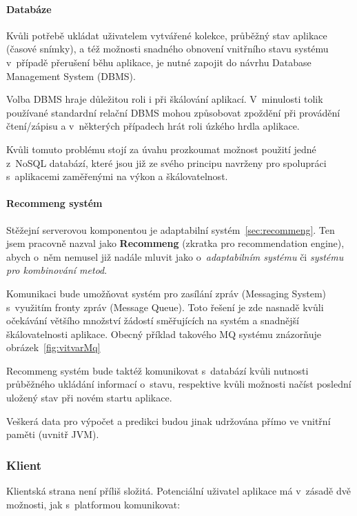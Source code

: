 \documentclass[thesis=M,czech]{FITthesis}[2014/05/07]
\begin{document}
\paragraph{Databáze}

Kvůli potřebě ukládat uživatelem vytvářené kolekce, průběžný stav aplikace (časové snímky), a též možnosti snadného obnovení vnitřního stavu systému v~případě přerušení běhu aplikace, je nutné zapojit do návrhu Database Management System (DBMS).

Volba DBMS hraje důležitou roli i při škálování aplikací. V~minulosti tolik používané standardní relační DBMS mohou způsobovat zpoždění při provádění čtení/zápisu a v~některých případech hrát roli úzkého hrdla aplikace.

Kvůli tomuto problému stojí za úvahu prozkoumat možnost použití jedné z~NoSQL databází, které jsou již ze svého principu navrženy pro spolupráci s~aplikacemi zaměřenými na výkon a škálovatelnost.

\paragraph{Recommeng systém}

Stěžejní serverovou komponentou je adaptabilní systém~\ref{sec:recommeng}. Ten jsem pracovně nazval jako \textbf{Recommeng} (zkratka pro recommendation engine), abych o~něm nemusel již nadále mluvit jako o~\emph{adaptabilním systému} či \emph{systému pro kombinování metod}. 

Komunikaci bude umožňovat systém pro zasílání zpráv (Messaging System) s~využitím fronty zpráv (Message Queue). Toto řešení je zde nasnadě kvůli očekávání většího množství žádostí směřujících na systém a snadnější škálovatelnosti aplikace. Obecný příklad takového MQ systému znázorňuje obrázek~\ref{fig:vitvarMq}

Recommeng systém bude taktéž komunikovat s~databází kvůli nutnosti průběžného ukládání informací o~stavu, respektive kvůli možnosti načíst poslední uložený stav při novém startu aplikace.

Veškerá data pro výpočet a predikci budou jinak udržována přímo ve vnitřní paměti (uvnitř JVM).

\subsubsection{Klient}

Klientská strana není příliš složitá. Potenciální uživatel aplikace má v~zásadě dvě možnosti, jak s~platformou komunikovat:
\end{document}
